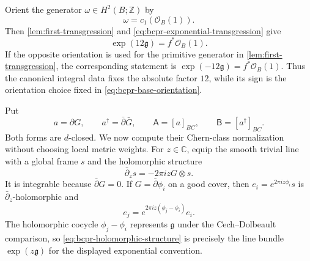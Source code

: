 Orient the generator $\omega\in H^2(B;\mathbb Z)$ by
\begin{equation}
 \omega=c_1(\mathcal O_B(1)).
\label{eq:bcpr-base-orientation}
\end{equation}
Then \cref{lem:first-transgression} and
\cref{eq:bcpr-exponential-transgression} give
\begin{equation}
 \exp(12\mathfrak g)=f^*\mathcal O_B(1).
\label{eq:bcpr-factor-twelve}
\end{equation}
If the opposite orientation is used for the primitive generator in
\cref{lem:first-transgression}, the corresponding statement is
$\exp(-12\mathfrak g)=f^*\mathcal O_B(1)$.  Thus the canonical integral
data fixes the absolute factor $12$, while its sign is the orientation
choice fixed in \cref{eq:bcpr-base-orientation}.

Put
\begin{equation}
 a=\partial G,
 \qquad a^\dagger=\bar\partial\bar G,
 \qquad
 \mathsf A=[a]_{BC},
 \qquad \mathsf B=[a^\dagger]_{BC}.
\label{eq:bcpr-a-b-definitions}
\end{equation}
Both forms are $d$-closed.  We now compute their Chern-class normalization
without choosing local metric weights.  For $z\in\mathbb C$, equip the
smooth trivial line with a global frame $s$ and the holomorphic structure
\begin{equation}
 \bar\partial_zs=-2\pi i zG\otimes s.
\label{eq:bcpr-holomorphic-structure}
\end{equation}
It is integrable because $\bar\partial G=0$.  If
$G=\bar\partial\phi_i$ on a good cover, then
$e_i=e^{2\pi iz\phi_i}s$ is $\bar\partial_z$-holomorphic and
\[
 e_j=e^{2\pi iz(\phi_j-\phi_i)}e_i.
\]
The holomorphic cocycle $\phi_j-\phi_i$ represents $\mathfrak g$ under
the Cech--Dolbeault comparison, so
\cref{eq:bcpr-holomorphic-structure} is precisely the line bundle
$\exp(z\mathfrak g)$ for the displayed exponential convention.

